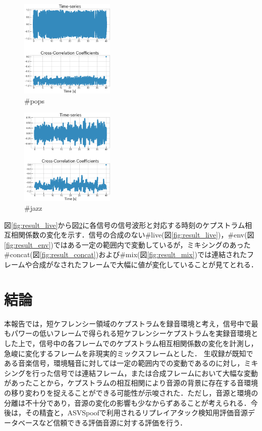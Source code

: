 \documentclass[technicalreport]{ieicej}
\begin{document}
\begin{figure}
	\centering
	\includegraphics[width=0.4\textwidth]{fig/pops.png}
	\caption{\#pops}
	\label{fig:result_pops}
\end{figure}
\begin{figure}
	\centering
	\includegraphics[width=0.4\textwidth]{fig/jazz.png}
	\caption{\#jazz}
	\label{fig:result_jazz}
\end{figure}

図\ref{fig:result_live}から図\ref{fig:result_jazz}に各信号の信号波形と対応する時刻のケプストラム相互相関係数の変化を示す．信号の合成のない\#live(図\ref{fig:result_live})，\#env(図\ref{fig:result_env})ではある一定の範囲内で変動しているが，ミキシングのあった\#concat(図\ref{fig:result_concat})および\#mix(図\ref{fig:result_mix})では連結されたフレームや合成がなされたフレームで大幅に値が変化していることが見てとれる．




\section{結論}
本報告では，短ケフレンシー領域のケプストラムを録音環境と考え，信号中で最もパワーの低いフレームで得られる短ケフレンシーケプストラムを実録音環境とした上で，信号中の各フレームでのケプストラム相互相関係数の変化を計測し，急峻に変化するフレームを非現実的ミックスフレームとした．
生収録が既知である音楽信号，環境騒音に対しては一定の範囲内での変動であるのに対し，ミキシングを行った信号では連結フレーム，または合成フレームにおいて大幅な変動があったことから，ケプストラムの相互相関により音源の背景に存在する音環境の移り変わりを捉えることができる可能性が示唆された．ただし，音源と環境の分離は不十分であり，音源の変化の影響も少なからずあることが考えられる．今後は，その精査と，ASVSpoofで利用されるリプレイアタック検知用評価音源データベースなど信頼できる評価音源に対する評価を行う．



\end{document}

